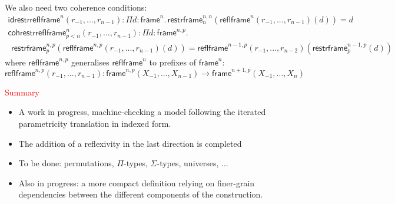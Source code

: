 \documentclass[12pt,landscape]{article}
\begin{document}
\begin{LARGE}
\begin{sf}
\bigskip

We also need two coherence conditions:
$$
\!\!\begin{array}{l}
\mathsf{idrestrreflframe}^n(r_{-1},...,r_{n-1}): \Pi d:\mathsf{frame}^n.\,\mathsf{restrframe}^{n,n}_n(\mathsf{reflframe}^n(r_{-1},...,r_{n-1})(d)) = d\\
\mathsf{cohrestrreflframe}^n_{p<n}(r_{-1},...,r_{n-1}): \Pi d:\mathsf{frame}^{n,p}.\,\\
~\,\mathsf{restrframe}^{n,p}_p(\mathsf{reflframe}^{n,p}(r_{-1},...,r_{n-1})(d)) =
\mathsf{reflframe}^{n-1,p}(r_{-1},...,r_{n-2})(\mathsf{restrframe}^{n-1,p}_p(d))
\end{array}
$$
where $\mathsf{reflframe}^{n,p}$ generalises $\mathsf{reflframe}^{n}$
to prefixes of $\mathsf{frame}^n$:
$$\mathsf{reflframe}^{n,p}(r_{-1},...,r_{n-1}):\mathsf{frame}^{n,p}(X_{-1},...,X_{n-1})
\rightarrow \mathsf{frame}^{n+1,p}(X_{-1},...,X_{n})$$

\newpage

\begin{center}
\textcolor{red}{\huge Summary}
\end{center}

\bigskip
\begin{itemize}
\item A work in progress, machine-checking a model following the iterated parametricity translation in indexed form.

\item The addition of a reflexivity in the last direction is completed

\item To be done: permutations, $\Pi$-types, $\Sigma$-types, universes, ...

\item Also in progress: a more compact definition relying on
  finer-grain dependencies between the different components of the
  construction.

\end{itemize}
\end{sf}
\end{LARGE}
\end{document}
